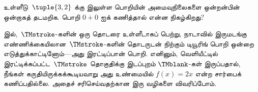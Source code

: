 \documentclass[../../../include/open-logic-section]{subfiles}
\begin{document}
\begin{prob}
உள்ளீடு~$\tuple{3,2}$ க்கு
 இலுள்ள பொறியின் அமைவுநிலைகளை
ஒன்றன்பின் ஒன்றாகத் தடமறிக. பொறி $0+0$ ஐக் கணித்தால் என்ன நிகழ்கிறது?
\end{prob}

\begin{explain}
 இல்,~$\TMstroke$-களின் ஒரு தொடரை உள்ளீடாகப்
பெற்று, நாடாவில் இருமடங்கு எண்ணிக்கையிலான~$\TMstroke$-களின் தொடருடன்
நிற்கும் டியூரிங் பொறி ஒன்றை எடுத்துக்காட்டினோம்---அது இரட்டிப்பான்
பொறி. எனினும், வெளியீட்டில் இரட்டிக்கப்பட்ட~$\TMstroke$ தொகுதிக்கு
இடப்புறம் $\TMblank$-கள் இருப்பதால், நீங்கள் கருதியிருக்கக்கூடியவாறு
அது உண்மையில் $f(x) = 2x$ என்ற சார்பைக் கணிப்பதில்லை. அதைச்
சரிசெய்வதற்கான இரு வழிகளை விவரிப்போம்.
\end{explain}
\end{document}
